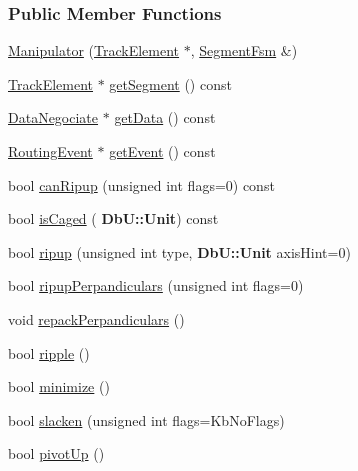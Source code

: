 \subsubsection*{Public Member Functions}
\begin{DoxyCompactItemize}
\item 
\mbox{\hyperlink{classKite_1_1Manipulator_ac02c770e24b6ff747867adcb7c4da92e}{Manipulator}} (\mbox{\hyperlink{classKite_1_1TrackElement}{Track\+Element}} $\ast$, \mbox{\hyperlink{classKite_1_1SegmentFsm}{Segment\+Fsm}} \&)
\item 
\mbox{\hyperlink{classKite_1_1TrackElement}{Track\+Element}} $\ast$ \mbox{\hyperlink{classKite_1_1Manipulator_a506a4d1cef59fc35984c1c88e0c0f6df}{get\+Segment}} () const
\item 
\mbox{\hyperlink{classKite_1_1DataNegociate}{Data\+Negociate}} $\ast$ \mbox{\hyperlink{classKite_1_1Manipulator_a54ca9d3c6d8ea145e053a37be8be8753}{get\+Data}} () const
\item 
\mbox{\hyperlink{classKite_1_1RoutingEvent}{Routing\+Event}} $\ast$ \mbox{\hyperlink{classKite_1_1Manipulator_a513f39c546ef4be0d13787cdace4eadf}{get\+Event}} () const
\item 
bool \mbox{\hyperlink{classKite_1_1Manipulator_acae2506c976194aef762d27900c97b02}{can\+Ripup}} (unsigned int flags=0) const
\item 
bool \mbox{\hyperlink{classKite_1_1Manipulator_a722e514efb92d4a05e4f4d9e1fe7f94b}{is\+Caged}} (\textbf{ Db\+U\+::\+Unit}) const
\item 
bool \mbox{\hyperlink{classKite_1_1Manipulator_a370b5a5373d3019510d4ec22f44c76c2}{ripup}} (unsigned int type, \textbf{ Db\+U\+::\+Unit} axis\+Hint=0)
\item 
bool \mbox{\hyperlink{classKite_1_1Manipulator_a147c24aa53f561c10d5d24b82b03448a}{ripup\+Perpandiculars}} (unsigned int flags=0)
\item 
void \mbox{\hyperlink{classKite_1_1Manipulator_a9721ea909a9b11297dea855e1ba82a55}{repack\+Perpandiculars}} ()
\item 
bool \mbox{\hyperlink{classKite_1_1Manipulator_af46102d49a7aa0c163de1bf143807794}{ripple}} ()
\item 
bool \mbox{\hyperlink{classKite_1_1Manipulator_aa61f08642d981761687635be108b9837}{minimize}} ()
\item 
bool \mbox{\hyperlink{classKite_1_1Manipulator_a82897c077e4c0d4281c3dce3e37ab997}{slacken}} (unsigned int flags=Kb\+No\+Flags)
\item 
bool \mbox{\hyperlink{classKite_1_1Manipulator_ad590137c4e7e8d5ad2a6f510e0d70e81}{pivot\+Up}} ()

\end{DoxyCompactItemize}
